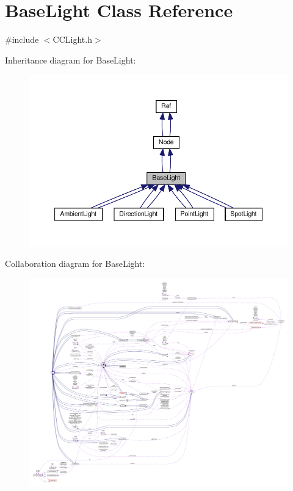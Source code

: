 \hypertarget{classBaseLight}{}\section{Base\+Light Class Reference}
\label{classBaseLight}


{\ttfamily \#include $<$C\+C\+Light.\+h$>$}



Inheritance diagram for Base\+Light\+:
\nopagebreak
\begin{figure}[H]
\begin{center}
\leavevmode
\includegraphics[width=350pt]{classBaseLight__inherit__graph}
\end{center}
\end{figure}


Collaboration diagram for Base\+Light\+:
\nopagebreak
\begin{figure}[H]
\begin{center}
\leavevmode
\includegraphics[width=350pt]{classBaseLight__coll__graph}
\end{center}
\end{figure}
